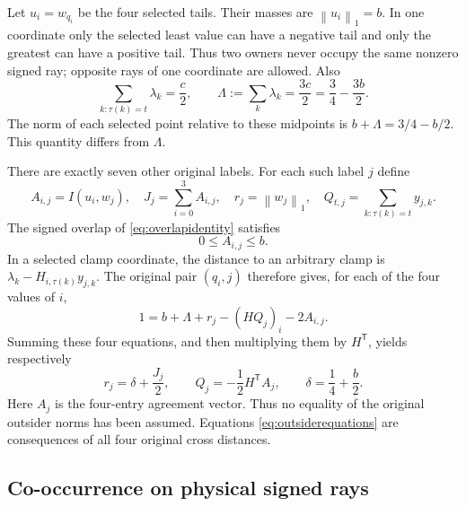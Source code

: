 \documentclass[11pt]{article}
\theoremstyle{definition}
\theoremstyle{remark}
\newcommand{\norm}[1]{\left\lVert#1\right\rVert_1}
\begin{document}
Let $u_i=w_{q_i}$ be the four selected tails. Their masses are
$\norm{u_i}=b$. In one coordinate only the selected least value can
have a negative tail and only the greatest can have a positive tail.
Thus two owners never occupy the same nonzero signed ray; opposite
rays of one coordinate are allowed. Also
\begin{equation}\label{eq:lambdatotal}
 \sum_{k:\tau(k)=t}\lambda_k=\frac c2,
 \qquad
 \Lambda:=\sum_k\lambda_k=\frac{3c}{2}
      =\frac34-\frac{3b}{2}.
\end{equation}
The norm of each selected point relative to these midpoints is
$b+\Lambda=3/4-b/2$. This quantity differs from $\Lambda$.

There are exactly seven other original labels. For each such label $j$
define
\[
 A_{i,j}=I(u_i,w_j),\quad J_j=\sum_{i=0}^3A_{i,j},\quad
 r_j=\norm{w_j},\quad
 Q_{t,j}=\sum_{k:\tau(k)=t}y_{j,k}.
\]
The signed overlap of \eqref{eq:overlapidentity} satisfies
\begin{equation}\label{eq:agreementbounds}
 0\leq A_{i,j}\leq b.
\end{equation}
In a selected clamp coordinate, the distance to an arbitrary clamp is
$\lambda_k-H_{i,\tau(k)}y_{j,k}$. The original pair $(q_i,j)$
therefore gives, for each of the four values of $i$,
\begin{equation}\label{eq:crossquartet}
 1=b+\Lambda+r_j-(HQ_j)_i-2A_{i,j}.
\end{equation}
Summing these four equations, and then multiplying them by
$H^{\mathsf T}$, yields respectively
\begin{equation}\label{eq:outsiderequations}
 r_j=\delta+\frac{J_j}{2},\qquad
 Q_j=-\frac12H^{\mathsf T}A_j,
 \qquad \delta=\frac14+\frac b2.
\end{equation}
Here $A_j$ is the four-entry agreement vector. Thus no equality of the
original outsider norms has been assumed. Equations
\eqref{eq:outsiderequations} are consequences of all four original
cross distances.

\subsection{Co-occurrence on physical signed rays}\label{subsec:cooccurrence}
\end{document}
